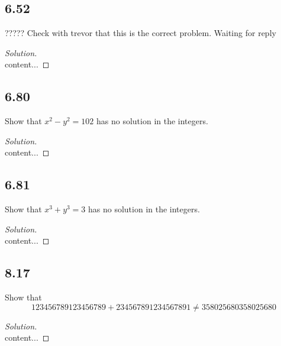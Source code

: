\documentclass[]{article}
\newcommand\<{\langle}
\renewcommand\>{\rangle}
\newenvironment{solution}
{
	\begin{proof}[Solution] \text{ }
		\\
	}
	{
	\end{proof}
}
\begin{document}
\subsection*{6.52} ????? Check with trevor that this is the correct problem. Waiting for reply
\begin{solution}
	content...
\end{solution}

\subsection*{6.80} Show that $x^2 - y^2 = 102$ has no solution in the integers.
\begin{solution}
	content...
\end{solution}

\subsection*{6.81} Show that $x^3 + y^3 = 3$ has no solution in the integers.
\begin{solution}
	content...
\end{solution}

\subsection*{8.17} Show that
$$
	123456789123456789 + 234567891234567891 \neq 358025680358025680
$$
\begin{solution}
	content...
\end{solution}
\end{document}
